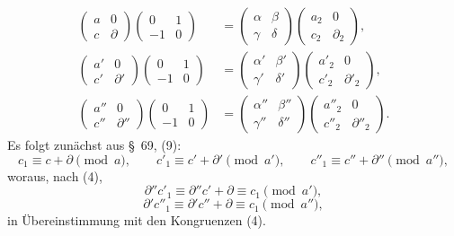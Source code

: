 \documentclass[11pt]{article}
\begin{document}
\begin{equation}
\begin{aligned}
\begin{pmatrix}a&0\\ c&\partial\end{pmatrix}
\begin{pmatrix}0&1\\ -1&0\end{pmatrix}
&=
\begin{pmatrix}\alpha&\beta\\ \gamma&\delta\end{pmatrix}
\begin{pmatrix}a_2&0\\ c_2&\partial_2\end{pmatrix},\\
\begin{pmatrix}a'&0\\ c'&\partial'\end{pmatrix}
\begin{pmatrix}0&1\\ -1&0\end{pmatrix}
&=
\begin{pmatrix}\alpha'&\beta'\\ \gamma'&\delta'\end{pmatrix}
\begin{pmatrix}a'_2&0\\ c'_2&\partial'_2\end{pmatrix},\\
\begin{pmatrix}a''&0\\ c''&\partial''\end{pmatrix}
\begin{pmatrix}0&1\\ -1&0\end{pmatrix}
&=
\begin{pmatrix}\alpha''&\beta''\\ \gamma''&\delta''\end{pmatrix}
\begin{pmatrix}a''_2&0\\ c''_2&\partial''_2\end{pmatrix}.
\end{aligned}
\tag{6}
\end{equation}
Es folgt zunächst aus \S~69, (9):
\[
 c_1\equiv c+\partial\pmod a,
 \qquad c'_1\equiv c'+\partial'\pmod {a'},
 \qquad c''_1\equiv c''+\partial''\pmod {a''},
\]
woraus, nach (4),
\[
 \partial''c'_1\equiv \partial''c'+\partial\equiv c_1\pmod {a'},
\]
\[
 \partial'c''_1\equiv \partial'c''+\partial\equiv c_1\pmod {a''},
\]
in Übereinstimmung mit den Kongruenzen (4).
\end{document}
